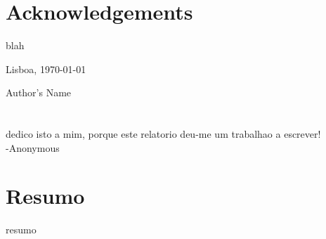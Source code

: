 \chapter*{Acknowledgements}
\thispagestyle{empty}

blah


\vfill
\begin{flushright}
  \begin{minipage}{8cm}
    \begin{center}
      Lisboa, \today

      Author's Name
    \end{center}
  \end{minipage}
\end{flushright}

\newpage
\thispagestyle{empty}

\cleardoublepage


\chapter*{}
\thispagestyle{empty}

\vfill
\mbox{}
\vfill\large
\begin{flushright}
  \begin{minipage}{8cm}
    \begin{center}

dedico isto a mim, porque este relatorio deu-me um trabalhao a escrever!\\
-Anonymous

    \end{center}
  \end{minipage}
\end{flushright}
\normalsize\vfill
\newpage
\thispagestyle{empty}

\cleardoublepage



\chapter*{Resumo}
\thispagestyle{empty}

resumo

\newpage
\thispagestyle{empty}


